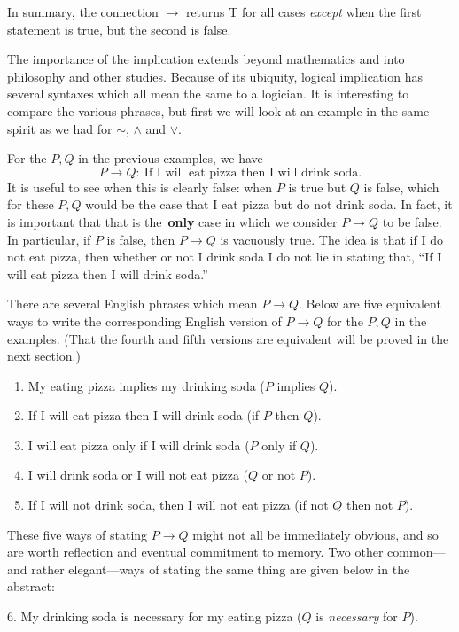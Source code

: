 In summary, the connection $\longrightarrow$ returns T for all
cases {\it except} when the first statement is true, but the second is 
false.

The importance of the implication extends beyond mathematics and into
philosophy and other studies.  Because of its ubiquity, logical
implication has several syntaxes which all mean the
same to a logician.  It is interesting
to compare the various phrases, but first we will
look at an example in the same spirit as we
had for $\sim$, $\wedge$ and $\vee$.


\bex 
For the $P,Q$ in the previous examples, we have
$$P\longrightarrow Q:\ 
\text{If I will eat pizza then I will drink soda}.$$
It is useful to see when this is clearly
false: when $P$ is true but $Q$ is false, which
for these  $P,Q$ would be the case that I eat 
pizza but do not drink soda. 
In fact, it is important that that is the \,{\bf only}
case in which we consider $P\longrightarrow Q$
to be false.  In particular, if $P$ is false,
then  $P\longrightarrow Q$ is  vacuously true.
The idea is that if I do not eat pizza,
then whether or not I drink soda I do not lie
in stating that, ``If I will eat pizza
then I will drink soda.''
\eex

There are several English phrases
which mean $P\longrightarrow Q$.
Below are five  equivalent ways to write the 
corresponding English version of $P\longrightarrow Q$
for the $P,Q$ in the examples.  (That the fourth and fifth
versions are equivalent will be proved in
the next section.)
\begin{enumerate}
\item My eating pizza implies my drinking soda
   ($P$ implies $Q$).\label{SixWaysForP->Q}
\item If I will eat pizza then I will drink soda
      (if $P$ then $Q$).
\item I will eat pizza {only if} I will drink soda
   ($P$ only if $Q$).
\item I will drink soda or I will not eat pizza
   ($Q$ or not $P$).
\item If I will not drink soda, then I will not eat pizza
   (if not $Q$ then not $P$).
\end{enumerate}
These five ways of stating $P\longrightarrow Q$ might not all be
immediately obvious, and so 
are worth reflection and eventual commitment to memory.
Two other common---and rather elegant---ways
of stating the same thing are given below in 
the abstract:
\medskip

6. My drinking soda is necessary for my eating pizza 
      ($Q$ is {\it necessary} for $P$).\medskip

